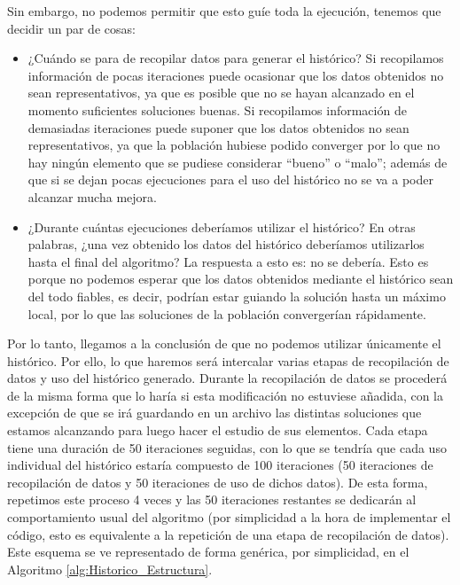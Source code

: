 Sin embargo, no podemos permitir que esto guíe toda la ejecución, tenemos que decidir un par de cosas:
\begin{itemize}
	\item ¿Cuándo se para de recopilar datos para generar el histórico? 
	Si recopilamos información de pocas iteraciones puede ocasionar que los datos obtenidos no sean representativos, ya que es posible que no se hayan alcanzado en el momento suficientes soluciones buenas. 
	Si recopilamos información de demasiadas iteraciones puede suponer que los datos obtenidos no sean representativos, ya que la población hubiese podido converger por lo que no hay ningún elemento que se pudiese considerar ``bueno'' o ``malo''; además de que si se dejan pocas ejecuciones para el uso del histórico no se va a poder alcanzar mucha mejora. 
	\item ¿Durante cuántas ejecuciones deberíamos utilizar el histórico? 
	En otras palabras, ¿una vez obtenido los datos del histórico deberíamos utilizarlos hasta el final del algoritmo? 
	La respuesta a esto es: no se debería. 
	Esto es porque no podemos esperar que los datos obtenidos mediante el histórico sean del todo fiables, es decir, podrían estar guiando la solución hasta un máximo local, por lo que las soluciones de la población convergerían rápidamente. 
\end{itemize}

Por lo tanto, llegamos a la conclusión de que no podemos utilizar únicamente el histórico. 
Por ello, lo que haremos será intercalar varias etapas de recopilación de datos y uso del histórico generado. 
Durante la recopilación de datos se procederá de la misma forma que lo haría si esta modificación no estuviese añadida, con la excepción de que se irá guardando en un archivo las distintas soluciones que estamos alcanzando para luego hacer el estudio de sus elementos. 
Cada etapa tiene una duración de 50 iteraciones seguidas, con lo que se tendría que cada uso individual del histórico estaría compuesto de 100 iteraciones (50 iteraciones de recopilación de datos y 50 iteraciones de uso de dichos datos). 
De esta forma, repetimos este proceso 4 veces y las 50 iteraciones restantes se dedicarán al comportamiento usual del algoritmo (por simplicidad a la hora de implementar el código, esto es equivalente a la repetición de una etapa de recopilación de datos). 
Este esquema se ve representado de forma genérica, por simplicidad, en el Algoritmo \ref{alg:Historico_Estructura}.

